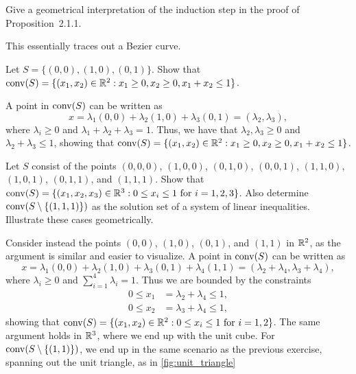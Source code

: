 \begin{exercise}
  Give a geometrical interpretation of the induction step in the proof of Proposition~2.1.1.
\end{exercise}

\begin{solution}
  This essentially traces out a Bezier curve.
\end{solution}

\begin{exercise}
  Let $S = \{ (0, 0), (1, 0), (0, 1) \}$.
  Show that $\operatorname*{conv}(S) = \{ (x_1, x_2) \in \mathbb{R}^2 : x_1 \geq 0, x_2 \geq 0, x_1 + x_2 \leq 1 \}$.
\end{exercise}

\begin{solution}
  A point in $\operatorname*{conv}(S)$ can be written as
  \begin{equation}
    x
    = \lambda_1 (0, 0) + \lambda_2 (1, 0) + \lambda_3 (0, 1)
    = (\lambda_2, \lambda_3),
  \end{equation}
  where $\lambda_i \geq 0$ and $\lambda_1 + \lambda_2 + \lambda_3 = 1$.
  Thus, we have that $\lambda_2, \lambda_3 \geq 0$ and $\lambda_2 + \lambda_3 \leq 1$, showing that $\operatorname*{conv}(S) = \{ (x_1, x_2) \in \mathbb{R}^2 : x_1 \geq 0, x_2 \geq 0, x_1 + x_2 \leq 1 \}$.
\end{solution}

\begin{exercise}
  Let $S$ consist of the points $(0, 0, 0)$, $(1, 0, 0)$, $(0, 1, 0)$, $(0, 0, 1)$, $(1, 1, 0)$, $(1, 0, 1)$, $(0, 1, 1)$, and $(1, 1, 1)$.
  Show that $\operatorname*{conv}(S) = \{ (x_1, x_2, x_3) \in \mathbb{R}^3 : 0 \leq x_i \leq 1 \text{ for } i = 1, 2, 3 \}$.
  Also determine $\operatorname*{conv}(S \setminus \{(1, 1, 1)\})$ as the solution set of a system of linear inequalities.
  Illustrate these cases geometrically.
\end{exercise}

\begin{solution}
  Consider instead the points $(0, 0)$, $(1, 0)$, $(0, 1)$, and $(1, 1)$ in $\mathbb{R}^2$, as the argument is similar and easier to visualize.
  A point in $\operatorname*{conv}(S)$ can be written as
  \begin{equation}
    x
    = \lambda_1 (0, 0) + \lambda_2 (1, 0) + \lambda_3 (0, 1) + \lambda_4 (1, 1)
    = (\lambda_2 + \lambda_4, \lambda_3 + \lambda_4),
  \end{equation}
  where $\lambda_i \geq 0$ and $\sum_{i=1}^4 \lambda_i = 1$.
  Thus we are bounded by the constraints
  \begin{align*}
    0 \leq x_1 &= \lambda_2 + \lambda_4 \leq 1, \\
    0 \leq x_2 &= \lambda_3 + \lambda_4 \leq 1,
  \end{align*}
  showing that $\operatorname*{conv}(S) = \{ (x_1, x_2) \in \mathbb{R}^2 : 0 \leq x_i \leq 1 \text{ for } i = 1, 2 \}$.
  The same argument holds in $\mathbb{R}^3$, where we end up with the unit cube.
  For $\operatorname*{conv}(S \setminus \{(1, 1)\})$, we end up in the same scenario as the previous exercise, spanning out the unit triangle, as in \cref{fig:unit_triangle}
\end{solution}

